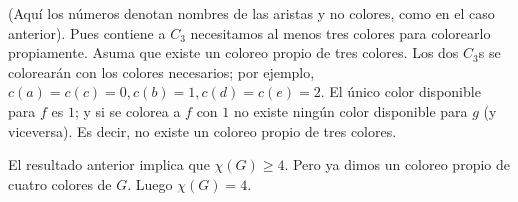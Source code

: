 \documentclass[a4paper, 12pt]{article}
\begin{document}
(Aquí los números denotan nombres de las aristas y no colores, como en el caso
anterior). Pues contiene a $C_3$ necesitamos al menos tres colores para
colorearlo propiamente. Asuma que existe un coloreo propio de tres colores. Los
dos $C_3$s se colorearán con los colores necesarios; por ejemplo, $c(a) = c(c) =
0, c(b) = 1, c(d) = c(e) = 2$. El único color disponible para $f$ es $1$; y si
se colorea a $f$ con $1$ no existe ningún color disponible para $g$ (y
viceversa). Es decir, no existe un coloreo propio de tres colores. 

El resultado anterior implica que $\chi(G) \geq 4$. Pero ya dimos un coloreo
propio de cuatro colores de $G$. Luego $\chi(G) = 4$.
\end{document}
